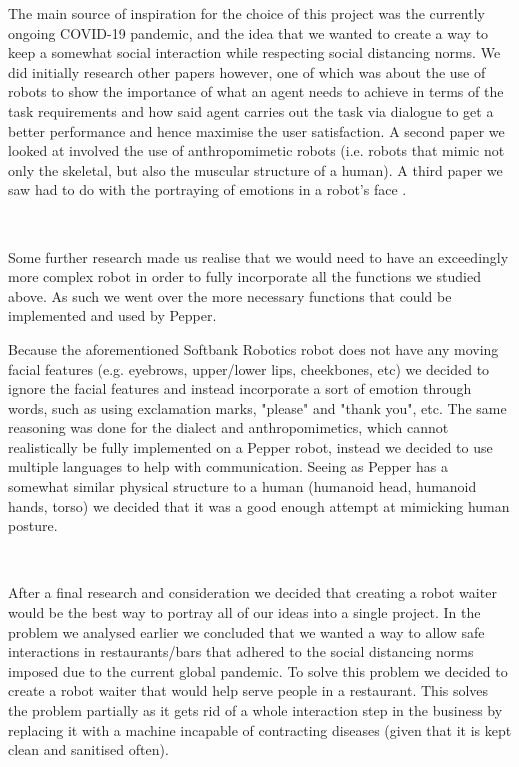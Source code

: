 \documentclass[12pt, letterpaper, twoside]{article}
\begin{document}
The main source of inspiration for the choice of this project was the currently ongoing COVID-19 pandemic, and the idea that we wanted to create a way to keep a somewhat social interaction while respecting social distancing norms. We did initially research other papers however, one of which was about the use of robots \cite{10.3115/976909.979652} to show the importance of what an agent needs to achieve in terms of the task requirements and how said agent carries out the task via dialogue to get a better performance and hence maximise the user satisfaction. A second paper we looked at involved the use of anthropomimetic robots \cite{Wittmeier2013TowardAR} (i.e. robots that mimic not only the skeletal, but also the muscular structure of a human). A third paper we saw had to do with the portraying of emotions in a robot's face \cite{BREAZEAL2003119}. 

\

Some further research made us realise that we would need to have an exceedingly more complex robot in order to fully incorporate all the functions we studied above. As such we went over the more necessary functions that could be implemented and used by Pepper.

Because the aforementioned Softbank Robotics robot does not have any moving facial features (e.g. eyebrows, upper/lower lips, cheekbones, etc) we decided to ignore the facial features and instead incorporate a sort of emotion through words, such as using exclamation marks, "please" and "thank you", etc. The same reasoning was done for the dialect and anthropomimetics, which cannot realistically be fully implemented on a Pepper robot, instead we decided to use multiple languages to help with communication. Seeing as Pepper has a somewhat similar physical structure to a human (humanoid head, humanoid hands, torso) we decided that it was a good enough attempt at mimicking human posture.

\

After a final research and consideration we decided that creating a robot waiter would be the best way to portray all of our ideas into a single project.
In the problem we analysed earlier we concluded that we wanted a way to allow safe interactions in restaurants/bars that adhered to the social distancing norms imposed due to the current global pandemic. To solve this problem we decided to create a robot waiter that would help serve people in a restaurant. This solves the problem partially as it gets rid of a whole interaction step in the business by replacing it with a machine incapable of contracting diseases (given that it is kept clean and sanitised often). 
\end{document}
